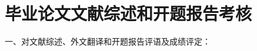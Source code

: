 
{
    \chapter*{毕业论文文献综述和开题报告考核}
    \bfseries

    {
        \noindent 一、对文献综述、外文翻译和开题报告评语及成绩评定：
    }


    \vspace{150mm}
    \designproposaleval[~~~~~~~~~~~~~~~~~~][~~~~~~~~~~~~~~~~~~][~~~~~~~~~~~~~~~~~~]
    \signature{开题报告答辩小组负责人（签名）}
}

